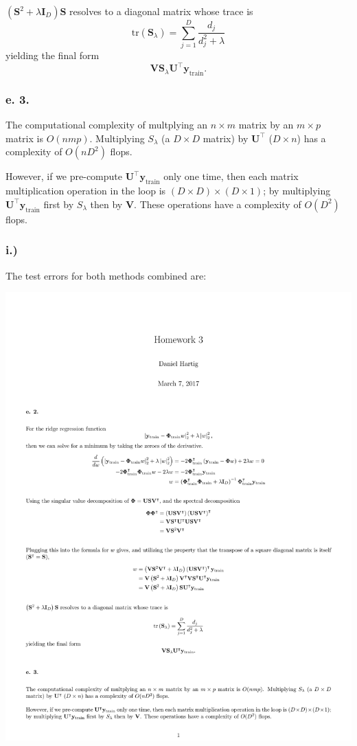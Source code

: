 \documentclass{article}
\begin{document}
$\left(\mathbf{S}^2+ \lambda\mathbf{I}_D\right)\mathbf{S}$ resolves to a diagonal matrix whose trace is 
\[\text{tr}\left(\mathbf{S}_\lambda\right) = \sum_{j=1}^{D} \frac{d_j}{d_j^2+\lambda}\] yielding the final form \[\mathbf{V}\mathbf{S}_\lambda\mathbf{U}^\intercal\mathbf{y}_{\text{train}}.\]

\subsubsection*{e. 3.}

The computational complexity of multplying an $n\times m$ matrix by an $m\times p$ matrix is $O(nmp)$. Multiplying $S_\lambda$ (a $D\times D$ matrix) by $\mathbf{U}^\intercal$ ($D\times n$) has a complexity of $O(nD^2)$ flops.

However, if we pre-compute $\mathbf{U}^\intercal\mathbf{y}_{\text{train}}$ only one time, then each matrix multiplication operation in the loop is $(D\times D)\times(D\times1)$; by multiplying  $\mathbf{U}^\intercal\mathbf{y}_{\text{train}}$ first by $S_\lambda$ then by $\mathbf{V}$. These operations have a complexity of $O(D^2)$ flops.

\pagebreak
\subsubsection*{i.)}

The test errors for both methods combined are:

\begin{center}\includegraphics[scale=0.8]{hw3}\end{center}
\end{document}

